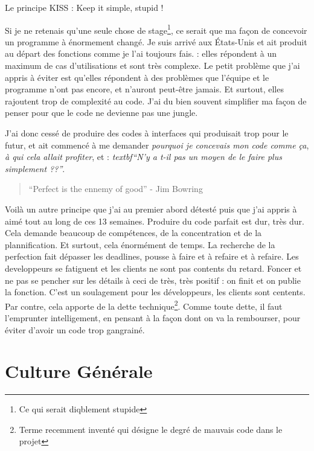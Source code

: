\begin{center}Le principe KISS : Keep it simple, stupid !\end{center}

Si je ne retenais qu'une seule chose de stage\footnote{Ce qui serait diqblement stupide}, ce serait que ma façon de concevoir un programme à énormement changé. Je suis arrivé aux États-Unis et ait produit au départ des fonctions comme je l'ai toujours fais. : elles répondent à un maximum de cas d'utilisations et sont très complexe. Le petit problème que j'ai appris à éviter est qu'elles répondent à des problèmes que l'équipe et le programme n'ont pas encore, et n'auront peut-être jamais. Et surtout, elles rajoutent trop de complexité au code. J'ai du bien souvent simplifier ma façon de penser pour que le code ne devienne pas une jungle.

J'ai donc cessé de produire des codes à interfaces qui produisait trop pour le futur, et ait commencé à me demander \emph{pourquoi je concevais mon code comme ça}, \emph{à qui cela allait profiter}, et : \emph{textbf{``N'y a t-il pas un moyen de le faire plus simplement ??''}}.

\begin{quote}
``Perfect is the ennemy of good'' - Jim Bowring
\end{quote}

Voilà un autre principe que j'ai au premier abord détesté puis que j'ai appris à aimé tout au long de ces 13 semaines. Produire du code parfait est dur, très dur. Cela demande beaucoup de compétences, de la concentration et de la plannification. Et surtout, cela énormément de temps. La recherche de la perfection fait dépasser les deadlines, pousse à faire et à refaire et à refaire. Les developpeurs se fatiguent et les clients ne sont pas contents du retard. Foncer et ne pas se pencher sur les détails à ceci de très, très positif : on finit et on publie la fonction. C'est un soulagement pour les développeurs, les clients sont centents. Par contre, cela apporte de la dette technique\footnote{Terme recemment inventé qui désigne le degré de mauvais code dans le projet}. Comme toute dette, il faut l'emprunter intelligement, en pensant à la façon dont on va la rembourser, pour éviter d'avoir un code trop gangrainé.

\section{Culture Générale}
